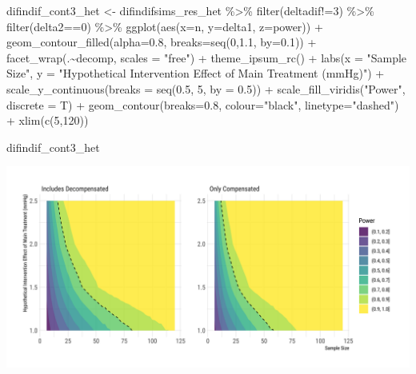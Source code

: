 \documentclass[
]{article}
\newenvironment{Shaded}{\begin{snugshade}}{\end{snugshade}}
\newcommand{\AttributeTok}[1]{\textcolor[rgb]{0.77,0.63,0.00}{#1}}
\newcommand{\DecValTok}[1]{\textcolor[rgb]{0.00,0.00,0.81}{#1}}
\newcommand{\FloatTok}[1]{\textcolor[rgb]{0.00,0.00,0.81}{#1}}
\newcommand{\FunctionTok}[1]{\textcolor[rgb]{0.00,0.00,0.00}{#1}}
\newcommand{\NormalTok}[1]{#1}
\newcommand{\OtherTok}[1]{\textcolor[rgb]{0.56,0.35,0.01}{#1}}
\newcommand{\SpecialCharTok}[1]{\textcolor[rgb]{0.00,0.00,0.00}{#1}}
\newcommand{\StringTok}[1]{\textcolor[rgb]{0.31,0.60,0.02}{#1}}
\begin{document}
\begin{Shaded}
\begin{Highlighting}[]
\NormalTok{difindif\_cont3\_het }\OtherTok{\textless{}{-}}\NormalTok{ difindifsims\_res\_het }\SpecialCharTok{\%\textgreater{}\%} 
  \FunctionTok{filter}\NormalTok{(deltadif}\SpecialCharTok{!=}\DecValTok{3}\NormalTok{) }\SpecialCharTok{\%\textgreater{}\%} 
  \FunctionTok{filter}\NormalTok{(delta2}\SpecialCharTok{==}\DecValTok{0}\NormalTok{) }\SpecialCharTok{\%\textgreater{}\%} 
  \FunctionTok{ggplot}\NormalTok{(}\FunctionTok{aes}\NormalTok{(}\AttributeTok{x=}\NormalTok{n, }\AttributeTok{y=}\NormalTok{delta1, }\AttributeTok{z=}\NormalTok{power)) }\SpecialCharTok{+}
  \FunctionTok{geom\_contour\_filled}\NormalTok{(}\AttributeTok{alpha=}\FloatTok{0.8}\NormalTok{, }\AttributeTok{breaks=}\FunctionTok{seq}\NormalTok{(}\DecValTok{0}\NormalTok{,}\FloatTok{1.1}\NormalTok{, }\AttributeTok{by=}\FloatTok{0.1}\NormalTok{)) }\SpecialCharTok{+}
  \FunctionTok{facet\_wrap}\NormalTok{(.}\SpecialCharTok{\textasciitilde{}}\NormalTok{decomp, }\AttributeTok{scales =} \StringTok{"free"}\NormalTok{) }\SpecialCharTok{+}
  \FunctionTok{theme\_ipsum\_rc}\NormalTok{() }\SpecialCharTok{+}
  \FunctionTok{labs}\NormalTok{(}\AttributeTok{x =} \StringTok{"Sample Size"}\NormalTok{,}
       \AttributeTok{y =} \StringTok{"Hypothetical Intervention Effect of Main Treatment (mmHg)"}\NormalTok{) }\SpecialCharTok{+}
  \FunctionTok{scale\_y\_continuous}\NormalTok{(}\AttributeTok{breaks =} \FunctionTok{seq}\NormalTok{(}\FloatTok{0.5}\NormalTok{, }\DecValTok{5}\NormalTok{, }\AttributeTok{by =} \FloatTok{0.5}\NormalTok{)) }\SpecialCharTok{+}
  \FunctionTok{scale\_fill\_viridis}\NormalTok{(}\StringTok{"Power"}\NormalTok{, }\AttributeTok{discrete =}\NormalTok{ T) }\SpecialCharTok{+}
  \FunctionTok{geom\_contour}\NormalTok{(}\AttributeTok{breaks=}\FloatTok{0.8}\NormalTok{, }\AttributeTok{colour=}\StringTok{"black"}\NormalTok{, }\AttributeTok{linetype=}\StringTok{"dashed"}\NormalTok{) }\SpecialCharTok{+}
  \FunctionTok{xlim}\NormalTok{(}\FunctionTok{c}\NormalTok{(}\DecValTok{5}\NormalTok{,}\DecValTok{120}\NormalTok{))}

\NormalTok{difindif\_cont3\_het}
\end{Highlighting}
\end{Shaded}

\includegraphics{figures/unnamed-chunk-80-2.png}
\end{document}
